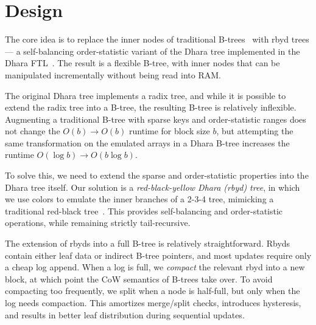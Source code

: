\documentclass[letterpaper,twocolumn,10pt]{article}
\begin{document}
\section{Design}
\label{sec:design}

The core idea is to replace the inner nodes of traditional
B-trees~\cite{ubiquitous-btree} with rbyd trees---%
a self-balancing order-statistic variant of the Dhara tree implemented in the
Dhara FTL~\cite{dhara}.
The result is a flexible B-tree, with inner nodes that can be
manipulated incrementally without being read into RAM.

The original Dhara tree implements a radix tree, and while it is
possible to extend the radix tree into a B-tree, the resulting
B-tree is relatively inflexible.
Augmenting a traditional B-tree with sparse keys and order-statistic ranges
does not change the $O(b) \rightarrow O(b)$ runtime for block size $b$,
but attempting the same transformation on the emulated arrays in a Dhara
B-tree increases the
runtime $O(\log b) \rightarrow O(b \log b)$.

To solve this, we need to extend the sparse and order-statistic
properties into the Dhara tree itself.
Our solution is a \emph{red-black-yellow Dhara (rbyd) tree}, %
in which we use colors to emulate the inner branches of a 2-3-4 tree,
mimicking a traditional red-black tree~\cite{rbtree}.
This provides self-balancing and order-statistic operations, while
remaining strictly tail-recursive.


The extension of rbyds into a full B-tree is relatively straightforward.
Rbyds contain either leaf data or indirect B-tree pointers, and most
updates require only a cheap log append. When a log is full, we \emph{compact}
the relevant rbyd into a new block, at which point the CoW
semantics of B-trees take over.
To avoid compacting too frequently, we split when a node is half-full, but
only when the
log needs compaction.
This
amortizes merge/split checks,
introduces hysteresis, and results in
better
leaf distribution during
sequential updates.
\end{document}
